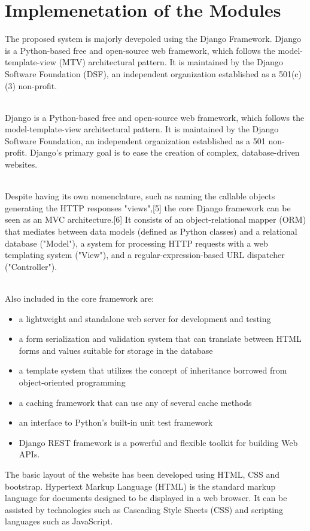 \documentclass[12pt,a4paper]{report}
\begin{document}
\section{Implemenetation of the Modules}
\hspace{0.25cm}
\par
The proposed system is majorly devepoled using the Django Framework. Django is a Python-based free and open-source web framework, which follows the model-template-view (MTV) architectural pattern. It is maintained by the Django Software Foundation (DSF), an independent organization established as a 501(c)(3) non-profit.
\\
\\
\par
Django is a Python-based free and open-source web framework, which follows the model-template-view architectural pattern. It is maintained by the Django Software Foundation, an independent organization established as a 501 non-profit. Django's primary goal is to ease the creation of complex, database-driven websites.
\\
\\
\par
Despite having its own nomenclature, such as naming the callable objects generating the HTTP responses "views",[5] the core Django framework can be seen as an MVC architecture.[6] It consists of an object-relational mapper (ORM) that mediates between data models (defined as Python classes) and a relational database ("Model"), a system for processing HTTP requests with a web templating system ("View"), and a regular-expression-based URL dispatcher ("Controller").
\\
\\
\par
Also included in the core framework are:
\begin{itemize}
	\item a lightweight and standalone web server for development and testing
	\item a form serialization and validation system that can translate between HTML forms and values suitable for storage in the database
	\item a template system that utilizes the concept of inheritance borrowed from object-oriented programming
	\item a caching framework that can use any of several cache methods
	\item an interface to Python's built-in unit test framework
	\item Django REST framework is a powerful and flexible toolkit for building Web APIs.
\end{itemize}
\par
The basic layout of the website has been developed using HTML, CSS and bootstrap. Hypertext Markup Language (HTML) is the standard markup language for documents designed to be displayed in a web browser. It can be assisted by technologies such as Cascading Style Sheets (CSS) and scripting languages such as JavaScript.
\end{document}
